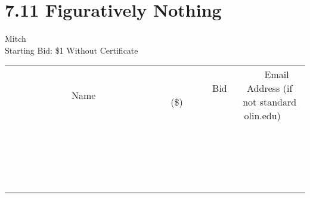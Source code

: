 \documentclass[11pt]{article}
\begin{document}
\section*{7.11 Figuratively Nothing}
Mitch
\\
Starting Bid: \$1
\newline
Without Certificate
\\[3ex]
\begin{tabular}{c c c}
~~~~~~~~~~~~~Name~~~~~~~~~~~~~ & ~~~~~~~~~Bid (\$)~~~~~~~~~  & ~~~Email Address (if not standard olin.edu)~~~\\
 & & \\
\hline
 & & \\
\hline
 & & \\
\hline
 & & \\
\hline
 & & \\
\hline
 & & \\
\hline
 & & \\
\hline
 & & \\
\hline
 & & \\
\hline
 & & \\
\hline
 & & \\
\hline
 & & \\
\hline
 & & \\
\hline
 & & \\
\hline
 & & \\
\hline
 & & \\
\hline
 & & \\
\hline
 & & \\
\hline
 & & \\
\hline
\end{tabular}
\newpage
\end{document}
